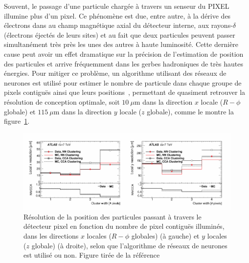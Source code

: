 Souvent, le passage d'une particule chargée à travers un senseur du
PIXEL illumine plus d'un pixel. Ce phénomène est due, entre autre, à
la dérive des électrons dans au champ magnétique axial du détecteur
interne, aux rayons-$\delta$ (électrons éjectés de leurs sites) et au
fait que deux particules peuvent passer simultanément très près les
unes des autres à haute luminosité. Cette dernière cause peut avoir un
effet dramatique sur la précision de l'estimation de position des
particules et arrive fréquemment dans les gerbes hadroniques de très
hautes énergies. Pour mitiger ce problème, un algorithme utilisant des
réseaux de neurones est utilisé pour estimer le nombre de particule
dans chaque groupe de pixels contiguës ainsi que leurs
positions~\cite{collaboration_neural_2014}, permettant de quasiment
retrouver la résolution de conception optimale, soit $10~\mu$m dans la direction $x$ locale ($R-\phi$ globale)
et $115~\mu$m dans la direction $y$ locale ($z$ globale), comme le montre la figure~\ref{fig:pixel_acc}.

\begin{figure}
  \centering
  \includegraphics{pixel_acc.pdf}
  \caption{Résolution de la position des particules passant à travers
    le détecteur pixel en fonction du nombre de pixel contiguës
    illuminés, dans les directions $x$ locales ($R-\phi$ globales) (à
    gauche) et $y$ locales ($z$ globale) (à droite), selon que
    l'algorithme de réseaux de neurones est utilisé ou non. Figure
    tirée de la référence~\cite{collaboration_neural_2014}}
  \label{fig:pixel_acc}
\end{figure}


